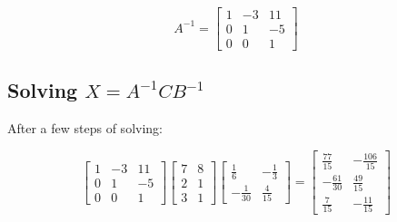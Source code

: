 \documentclass{article}
\begin{document}
\[
A^{-1} = \begin{bmatrix}
1 & -3 & 11 \\
0 & 1 & -5 \\
0 & 0 & 1
\end{bmatrix}
\]

\subsection*{Solving \( X = A^{-1}CB^{-1} \)}

After a few steps of solving:

\[
\begin{bmatrix}
1 & -3 & 11 \\
0 & 1 & -5 \\
0 & 0 & 1
\end{bmatrix}
\begin{bmatrix}
7 & 8 \\
2 & 1 \\
3 & 1
\end{bmatrix}
\begin{bmatrix}
\frac{1}{6} & -\frac{1}{3} \\
-\frac{1}{30} & \frac{4}{15}
\end{bmatrix}
=
\begin{bmatrix}
\frac{77}{15} & -\frac{106}{15} \\
-\frac{61}{30} & \frac{49}{15} \\
\frac{7}{15} & -\frac{11}{15}
\end{bmatrix}
\]
\end{document}
